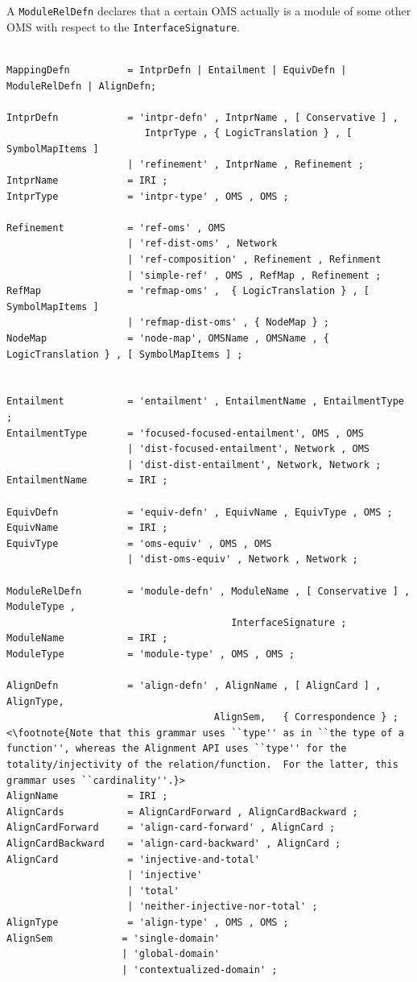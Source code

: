 \documentclass[10pt,%
\ifpretendfinal
final%
\else
draft%
\fi,
]{scrreprt}
\newcommand*{\syntax}[1]{\texttt{#1}}
\begin{document}
A \syntax{ModuleRelDefn} declares that a certain OMS
actually is a module of some other OMS with respect
to the \syntax{InterfaceSignature}.


\begin{lstlisting}[language=ebnf,escapeinside={<>},mathescape]  % abstract syntax

MappingDefn          = IntprDefn | Entailment | EquivDefn | ModuleRelDefn | AlignDefn;

IntprDefn            = 'intpr-defn' , IntprName , [ Conservative ] , 
                        IntprType , { LogicTranslation } , [ SymbolMapItems ]                     
                     | 'refinement' , IntprName , Refinement ;
IntprName            = IRI ;
IntprType            = 'intpr-type' , OMS , OMS ;

Refinement           = 'ref-oms' , OMS 
                     | 'ref-dist-oms' , Network
                     | 'ref-composition' , Refinement , Refinment
                     | 'simple-ref' , OMS , RefMap , Refinement ;
RefMap               = 'refmap-oms' ,  { LogicTranslation } , [ SymbolMapItems ] 
                     | 'refmap-dist-oms' , { NodeMap } ;
NodeMap              = 'node-map', OMSName , OMSName , { LogicTranslation } , [ SymbolMapItems ] ;


Entailment           = 'entailment' , EntailmentName , EntailmentType ;
EntailmentType       = 'focused-focused-entailment', OMS , OMS 
                     | 'dist-focused-entailment', Network , OMS 
                     | 'dist-dist-entailment', Network, Network ;
EntailmentName       = IRI ;

EquivDefn            = 'equiv-defn' , EquivName , EquivType , OMS ;
EquivName            = IRI ;
EquivType            = 'oms-equiv' , OMS , OMS 
                     | 'dist-oms-equiv' , Network , Network ;

ModuleRelDefn        = 'module-defn' , ModuleName , [ Conservative ] , ModuleType ,
                                       InterfaceSignature ;
ModuleName           = IRI ;
ModuleType           = 'module-type' , OMS , OMS ;

AlignDefn            = 'align-defn' , AlignName , [ AlignCard ] , AlignType, 
                                    AlignSem,   { Correspondence } ; <\footnote{Note that this grammar uses ``type'' as in ``the type of a function'', whereas the Alignment API uses ``type'' for the totality/injectivity of the relation/function.  For the latter, this grammar uses ``cardinality''.}>
AlignName            = IRI ;
AlignCards           = AlignCardForward , AlignCardBackward ; 
AlignCardForward     = 'align-card-forward' , AlignCard ;
AlignCardBackward    = 'align-card-backward' , AlignCard ;
AlignCard            = 'injective-and-total'
                     | 'injective'
                     | 'total'
                     | 'neither-injective-nor-total' ;
AlignType            = 'align-type' , OMS , OMS ;
AlignSem            = 'single-domain' 
                    | 'global-domain' 
                    | 'contextualized-domain' ; 


\end{lstlisting}
\end{document}
